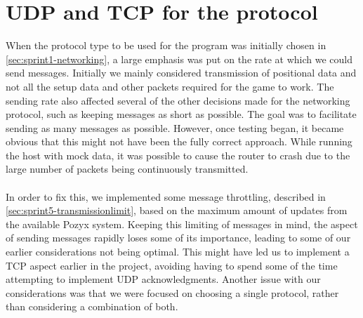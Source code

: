 \section{UDP and TCP for the protocol}
When the protocol type to be used for the program was initially chosen in \autoref{sec:sprint1-networking}, a large emphasis was put on the rate at which we could send messages.
Initially we mainly considered transmission of positional data and not all the setup data and other packets required for the game to work.
The sending rate also affected several of the other decisions made for the networking protocol, such as keeping messages as short as possible.
The goal was to facilitate sending as many messages as possible.
However, once testing began, it became obvious that this might not have been the fully correct approach.
While running the host with mock data, it was possible to cause the router to crash due to the large number of packets being continuously transmitted.
\\\\
In order to fix this, we implemented some message throttling, described in \autoref{sec:sprint5-transmissionlimit}, based on the maximum amount of updates from the available Pozyx system.
Keeping this limiting of messages in mind, the aspect of sending messages rapidly loses some of its importance, leading to some of our earlier considerations not being optimal.
This might have led us to implement a TCP aspect earlier in the project, avoiding having to spend some of the time attempting to implement UDP acknowledgments.
Another issue with our considerations was that we were focused on choosing a single protocol, rather than considering a combination of both.
